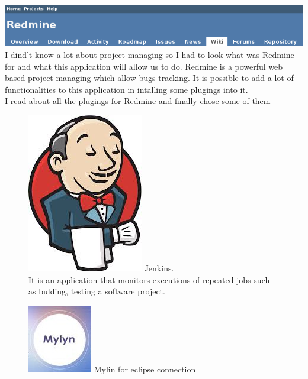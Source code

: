 \includegraphics[width=\textwidth]{Images/redmine.png}
\newline
\\
I dind't know a lot about project managing so I had to look what was Redmine for and what this application will allow us to do. 
Redmine is a powerful web based project managing which allow bugs tracking. It is possible to add a lot of functionalities to this application in intalling  some plugings into it. \\ 
I read about all the plugings for Redmine and finally chose some of them  
	\begin{figure}
		\includegraphics[scale=0.1]{Images/jenkins.jpeg} 
		Jenkins. \\
		It is an application that monitors executions of repeated jobs such as bulding, testing a software project.
	\end{figure} 
	\begin{figure}[h]
		\includegraphics[scale=0.2]{Images/mylin.jpeg} 
		Mylin for eclipse connection
	\end{figure} 
